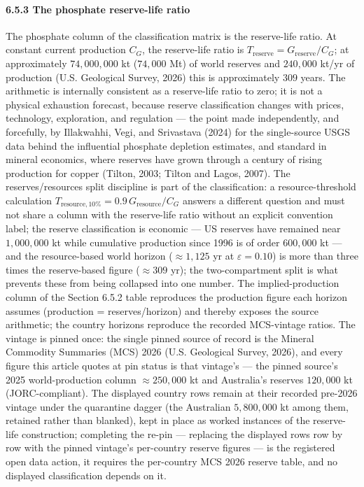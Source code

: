\documentclass[11pt]{article}
\begin{document}
\paragraph{6.5.3 The phosphate reserve-life
ratio}\label{the-phosphate-reserve-life-ratio}

The phosphate column of the classification matrix is the reserve-life
ratio. At constant current production \(C_G\), the reserve-life ratio is
\(T_{\mathrm{reserve}} = G_{\mathrm{reserve}}/C_G\); at approximately
\(74{,}000{,}000\) kt (\(74{,}000\) Mt) of world reserves and
\(240{,}000\) kt/yr of production (U.S. Geological Survey, 2026) this is
approximately \(309\) years. The arithmetic is internally consistent as
a reserve-life ratio to zero; it is not a physical exhaustion forecast,
because reserve classification changes with prices, technology,
exploration, and regulation --- the point made independently, and
forcefully, by Illakwahhi, Vegi, and Srivastava (2024) for the
single-source USGS data behind the influential phosphate depletion
estimates, and standard in mineral economics, where reserves have grown
through a century of rising production for copper (Tilton, 2003; Tilton
and Lagos, 2007). The reserves/resources split discipline is part of the
classification: a resource-threshold calculation
\(T_{\mathrm{resource},10\%} = 0.9\, G_{\mathrm{resource}}/C_G\) answers
a different question and must not share a column with the reserve-life
ratio without an explicit convention label; the reserve classification
is economic --- US reserves have remained near \(1{,}000{,}000\) kt
while cumulative production since 1996 is of order \(600{,}000\) kt ---
and the resource-based world horizon (\(\approx 1{,}125\) yr at
\(\varepsilon = 0.10\)) is more than three times the reserve-based
figure (\(\approx 309\) yr); the two-compartment split is what prevents
these from being collapsed into one number. The implied-production
column of the Section 6.5.2 table reproduces the production figure each
horizon assumes (production = reserves/horizon) and thereby exposes the
source arithmetic; the country horizons reproduce the recorded
MCS-vintage ratios. The vintage is pinned once: the single pinned source
of record is the Mineral Commodity Summaries (MCS) 2026 (U.S. Geological
Survey, 2026), and every figure this article quotes at pin status is
that vintage's --- the pinned source's 2025 world-production column
\(\approx 250{,}000\) kt and Australia's reserves \(120{,}000\) kt
(JORC-compliant). The displayed country rows remain at their recorded
pre-2026 vintage under the quarantine dagger (the Australian
\(5{,}800{,}000\) kt among them, retained rather than blanked), kept in
place as worked instances of the reserve-life construction; completing
the re-pin --- replacing the displayed rows row by row with the pinned
vintage's per-country reserve figures --- is the registered open data
action, it requires the per-country MCS 2026 reserve table, and no
displayed classification depends on it.
\end{document}

